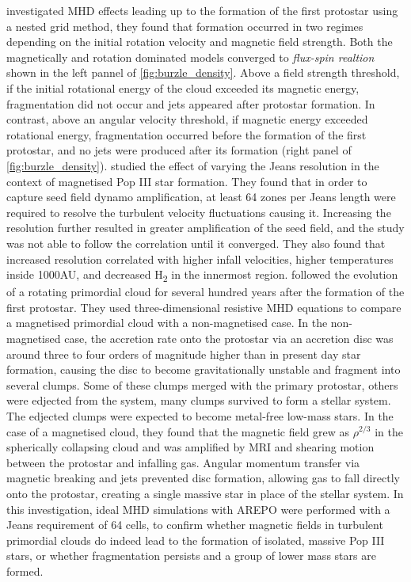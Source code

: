 \documentclass[11pt]{article}
\begin{document}
\cite{Machida2008a} investigated MHD effects leading up to the formation of the first protostar using a nested grid method, they found that formation occurred in two regimes depending on the initial rotation velocity and magnetic field strength. Both the magnetically and rotation dominated models converged to \emph{flux-spin realtion} shown in the left pannel of \autoref{fig:burzle_density}. Above a field strength threshold, if the initial rotational energy of the cloud exceeded its magnetic energy, fragmentation did not occur and jets appeared after protostar formation. In contrast, above an angular velocity threshold, if magnetic energy exceeded rotational energy, fragmentation occurred before the formation of the first protostar, and no jets were produced after its formation (right panel of \autoref{fig:burzle_density}). \cite{Turk2012} studied the effect of varying the Jeans resolution in the context of magnetised Pop III star formation. They found that in order to capture seed field dynamo amplification, at least 64 zones per Jeans length were required to resolve the turbulent velocity fluctuations causing it. Increasing the resolution further resulted in greater amplification of the seed field, and the study was not able to follow the correlation until it converged. They also found that increased resolution correlated with higher infall velocities, higher temperatures inside 1000AU, and decreased H\textsubscript{2} in the innermost region. \cite{Machida2013}  followed the evolution of a rotating primordial cloud for several hundred years after the formation of the first protostar. They used three-dimensional resistive MHD equations to compare a magnetised primordial cloud with a non-magnetised case. In the non-magnetised case, the accretion rate onto the protostar via an accretion disc was around three to four orders of magnitude higher than in present day star formation, causing the disc to become gravitationally unstable and fragment into several clumps. Some of these clumps merged with the primary protostar, others were edjected from the system, many clumps survived to form a stellar system. The edjected clumps were expected to become metal-free low-mass stars. In the case of a magnetised cloud, they found that the magnetic field grew as $\rho^{2/3}$ in the spherically collapsing cloud and was amplified by MRI and shearing motion between the protostar and infalling gas. Angular momentum transfer via magnetic breaking and jets prevented disc formation, allowing gas to fall directly onto the protostar, creating a single massive star in place of the stellar system.
In this investigation, ideal MHD simulations with AREPO were performed with a Jeans requirement of 64 cells, to confirm whether magnetic fields in turbulent primordial clouds do indeed lead to the formation of isolated, massive Pop III stars, or whether fragmentation persists and a group of lower mass stars are formed.
\end{document}
